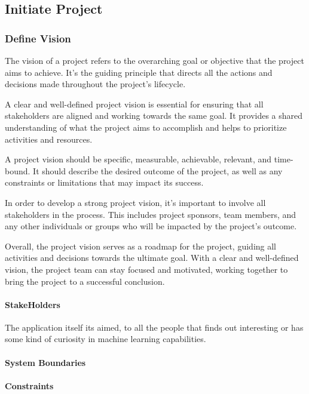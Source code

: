 \subsection{Initiate Project}

\subsubsection{Define Vision}
The vision of a project refers to the overarching goal or objective that the project aims to achieve. It's the guiding principle that directs all the actions and decisions made throughout the project's lifecycle.

A clear and well-defined project vision is essential for ensuring that all stakeholders are aligned and working towards the same goal. It provides a shared understanding of what the project aims to accomplish and helps to prioritize activities and resources.

A project vision should be specific, measurable, achievable, relevant, and time-bound. It should describe the desired outcome of the project, as well as any constraints or limitations that may impact its success.

In order to develop a strong project vision, it's important to involve all stakeholders in the process. This includes project sponsors, team members, and any other individuals or groups who will be impacted by the project's outcome.

Overall, the project vision serves as a roadmap for the project, guiding all activities and decisions towards the ultimate goal. With a clear and well-defined vision, the project team can stay focused and motivated, working together to bring the project to a successful conclusion.
 
\paragraph{StakeHolders}
 The application itself its aimed, to all the people that finds out interesting or has some kind of curiosity in machine learning capabilities.
 
\paragraph{System Boundaries}

\paragraph{Constraints}


